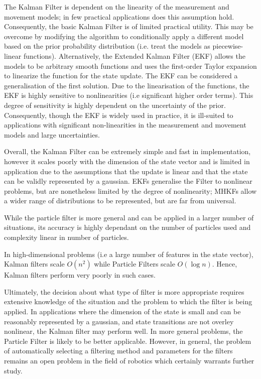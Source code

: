 \documentclass[english]{article}
\begin{document}
The Kalman Filter is dependent on the linearity of the measurement and movement models; in few practical applications does this assumption hold. Consequently, the basic Kalman Filter is of limited practical utility. This may be overcome by  modifying the algorithm to conditionally apply a different model based on the prior probability distribution (i.e. treat the models as piecewise-linear functions). Alternatively, the Extended Kalman Filter (EKF) allows the models to be arbitrary smooth functions and uses the first-order Taylor expansion to linearize the function for the state update. The EKF can be considered a generalisation of the first solution. Due to the linearisation of the functions, the EKF is highly sensitive to nonlinearities (i.e significant higher order terms). This degree of sensitivity is highly dependent on the uncertainty of the prior\cite{probrob}. Consequently, though the EKF is widely used in practice\cite{probrob}, it is ill-suited to applications with significant non-linearities in the measurement and movement models and large uncertainties.

Overall, the Kalman Filter can be extremely simple and fast in implementation, however it scales poorly with the dimension of the state vector and is limited in application due to the assumptions that the update is linear and that the state can be validly represented by a gaussian. EKFs generalise the Filter to nonlinear problems, but are nonetheless limited by the degree of nonlinearity; MHKFs allow a wider range of distributions to be represented, but are far from universal.

While the particle filter is more general and can be applied in a larger number of situations, its accuracy is highly dependant on the number of particles used and complexity linear in number of particles.

In high-dimensional problems (i.e a large number of features in the state vector), Kalman filters scale $O(n^2)$ while Particle Filters scale $O(\log n)$. Hence, Kalman filters perform very poorly in such cases.

Ultimately, the decision about what type of filter is more appropriate requires extensive knowledge of the situation and the problem to which the filter is being applied. In applications where the dimension of the state is small and can be reasonably represented by a gaussian, and state transitions are not overley nonlinear, the Kalman filter may perform well. In more general problems, the Particle Filter is likely to be better applicable. However, in general, the problem of automatically selecting a filtering method and parameters for the filters remains an open problem in the field of robotics which certainly warrants further study.



\end{document}
